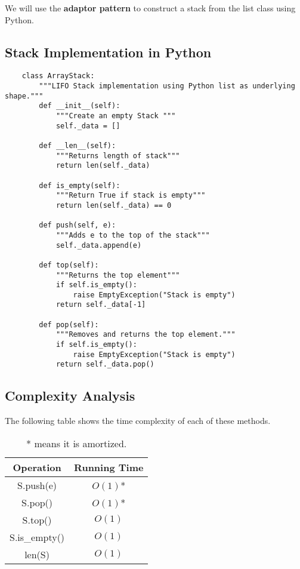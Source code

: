 \documentclass[]{article}
\begin{document}
We will use the \textbf{adaptor pattern} to construct a stack from the list class using Python.\\

\subsection{Stack Implementation in Python}\bigbreak

 \begin{lstlisting}
 	class ArrayStack:
 		"""LIFO Stack implementation using Python list as underlying shape."""
 		def __init__(self):
 			"""Create an empty Stack """
 			self._data = []
 		
 		def __len__(self):
 			"""Returns length of stack"""
 			return len(self._data)
 			
 		def is_empty(self):
 			"""Return True if stack is empty"""
 			return len(self._data) == 0
 			
 		def push(self, e):
 			"""Adds e to the top of the stack"""
 			self._data.append(e)
 			
 		def top(self):
 			"""Returns the top element"""
 			if self.is_empty():
 				raise EmptyException("Stack is empty")
 			return self._data[-1]
 		
 		def pop(self):
 			"""Removes and returns the top element."""
 			if self.is_empty():
 				raise EmptyException("Stack is empty")
 			return self._data.pop()
 \end{lstlisting}\bigbreak

\subsection{Complexity Analysis}\bigbreak

The following table shows the time complexity of each of these methods.

\begin{center}
	\begin{table}[h!]\centering
		\begin{tabular}{|c|c|}
			\hline
			Operation   & Running Time\\\hline
			S.push(e) & $O(1)$*\\
			S.pop() & $O(1)$*\\
			S.top() & $O(1)$\\
			S.is\_empty() & $O(1)$\\
			len(S) & $O(1)$\\\hline
		\end{tabular}
		\caption*{* means it is amortized.}
	\end{table}
\end{center}\bigbreak
\end{document}
